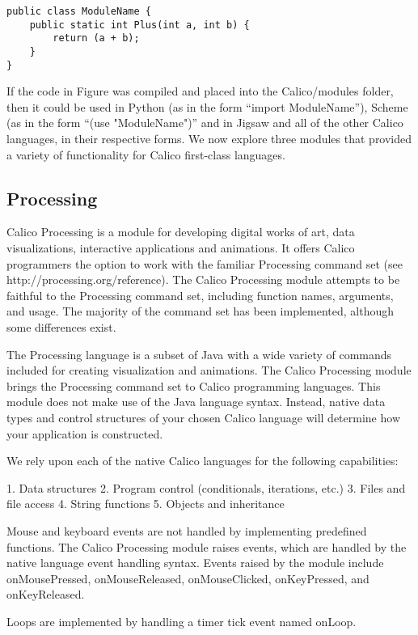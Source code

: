 \documentclass[preprint]{sigplanconf}
\begin{document}
\begin{verbatim}
public class ModuleName {
    public static int Plus(int a, int b) {
        return (a + b);
    }
}
\end{verbatim}


If the code in Figure was compiled and placed into the Calico/modules folder, then it could be used in Python (as in the form ``import ModuleName''), Scheme (as in the form ``(use "ModuleName")'' and in Jigsaw and all of the other Calico languages, in their respective forms. We now explore three modules that provided a variety of functionality for Calico first-class languages.


\subsection{Processing}


Calico Processing is a module for developing digital works of art, data visualizations, interactive applications and animations. It offers Calico programmers the option to work with the familiar  Processing command set (see http://processing.org/reference). The Calico Processing module attempts to be faithful to the Processing command set, including function names, arguments, and usage. The majority of the command set has been implemented, although some differences exist. 


The Processing language is a subset of Java with a wide variety of commands included for creating visualization and animations. The Calico Processing module brings the Processing command set to Calico programming languages. This module does not make use of the Java language syntax. Instead, native data types and control structures of your chosen Calico language will determine how your application is constructed.


We rely upon each of the native Calico languages for the following capabilities:


1. Data structures
2. Program control (conditionals, iterations, etc.)
3. Files and file access
4. String functions
5. Objects and inheritance


Mouse and keyboard events are not handled by implementing predefined functions. The Calico Processing module raises events, which are handled by the native language event handling syntax. Events raised by the module include onMousePressed, onMouseReleased, onMouseClicked, onKeyPressed, and onKeyReleased.


Loops are implemented by handling a timer tick event named onLoop.
\end{document}
